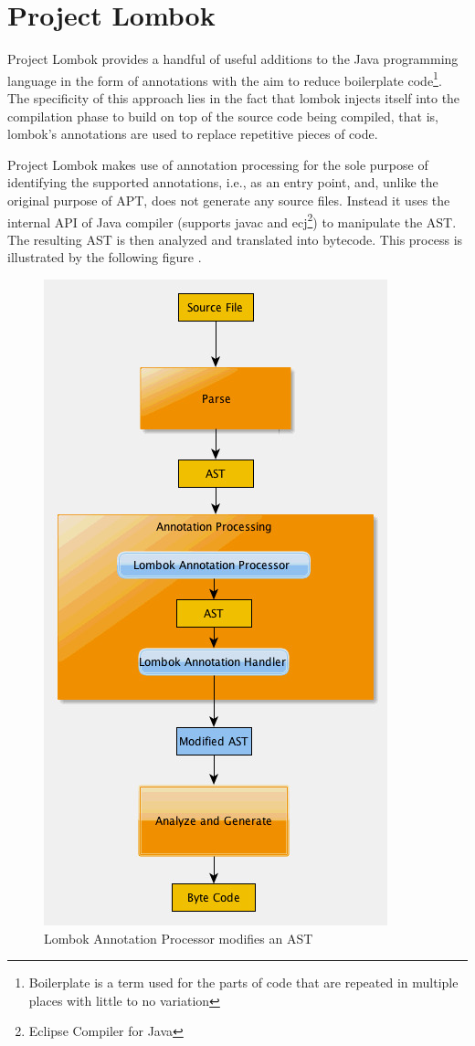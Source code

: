 \section{Project Lombok}
Project Lombok \cite{lombok} provides a handful of useful additions to the Java programming language in the form of annotations with the aim to reduce boilerplate code\footnote{Boilerplate is a term used for the parts of code that are repeated in multiple places with little to no variation}.
The specificity of this approach lies in the fact that lombok injects itself into the compilation phase to build on top of the source code being compiled, that is, lombok’s annotations are used to replace repetitive pieces of code.

\n

Project Lombok makes use of annotation processing for the sole purpose of identifying the supported annotations, i.e., as an entry point, and, unlike the original purpose of APT, does not generate any source files.
Instead it uses the internal API of Java compiler (supports javac and ecj\footnote{Eclipse Compiler for Java}) to manipulate the AST.
The resulting AST is then analyzed and translated into bytecode.
This process is illustrated by the following figure \cite{lombok-fig}.
\begin{figure}[H]\centering
    \includegraphics[scale=0.5]{images/lombok.jpg}
    \caption{Lombok Annotation Processor modifies an AST}
    \label{fig:lombok}
\end{figure}

